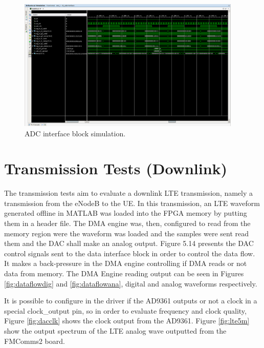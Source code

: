 \begin{figure}[htbp]
    \centering
    \includegraphics[width=0.95\textwidth,
    trim={{.13\textwidth} {.95\textwidth} {.05\textwidth} {.15\textwidth}},
    clip]{./figures/adcInterface}
    \caption{ ADC interface block simulation.
    \label{fig:simadc}}
\end{figure}



\section{Transmission Tests (Downlink)}
\label{result:dac}

The transmission tests aim to evaluate a downlink LTE transmission, namely a
transmission from the eNodeB to the UE. In this transmission, an LTE waveform
generated offline in MATLAB was loaded into the FPGA memory by putting them in a
header file. The DMA engine was, then, configured to read from the memory region
were the waveform was loaded and the samples were sent read them and the DAC
shall make an analog output. Figure 5.14 presents the DAC control signals sent
to the data interface block in order to control the data flow. It makes a
back-pressure in the DMA engine controlling if DMA reads or not data from
memory. The DMA Engine reading output can be seen in Figures
\ref{fig:dataflowdig} and \ref{fig:dataflowana}, digital and analog waveforms
respectively.

It is possible to configure in the driver if the AD9361 outputs or not a clock
in a special clock\_output pin, so in order to evaluate frequency and clock
quality, Figure \ref{fig:dacclk} shows the clock output from the AD9361. Figure
\ref{fig:lte5m} show the output spectrum of the LTE analog wave outputted from
the FMComms2 board.

